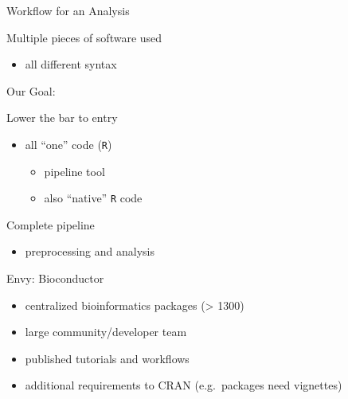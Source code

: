 \documentclass[ignorenonframetext,]{beamer}
\providecommand{\tightlist}{%
  \setlength{\itemsep}{0pt}\setlength{\parskip}{0pt}}
\begin{document}
\begin{frame}

\hypertarget{left_col2}{}
Workflow for an Analysis

Multiple pieces of software used

\begin{itemize}
\tightlist
\item
  all different syntax
\end{itemize}

\hypertarget{right_col2}{}

\end{frame}

\begin{frame}[fragile]

\hypertarget{left_col2}{}
Our Goal:

Lower the bar to entry

\begin{itemize}
\tightlist
\item
  all ``one'' code (\texttt{R})

  \begin{itemize}
  \tightlist
  \item
    pipeline tool
  \item
    also ``native'' \texttt{R} code
  \end{itemize}
\end{itemize}

Complete pipeline

\begin{itemize}
\tightlist
\item
  preprocessing and analysis
\end{itemize}

\hypertarget{right_col2}{}

\end{frame}

\begin{frame}{Envy: Bioconductor }
\protect\hypertarget{envy-bioconductor}{}

\begin{itemize}
\tightlist
\item
  centralized bioinformatics packages (\textgreater{} 1300)
\item
  large community/developer team
\item
  published tutorials and workflows
\item
  additional requirements to CRAN (e.g.~packages need vignettes)
\end{itemize}

\end{frame}
\end{document}
